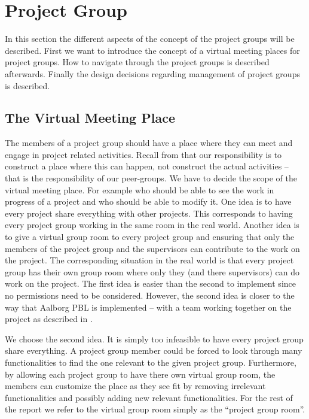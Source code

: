 \section{Project Group}
\label{sec:projectgroup}
In this section the different aspects of the concept of the project groups will be described.
First we want to introduce the concept of a virtual meeting places for project groups.
How to navigate through the project groups is described afterwards.
Finally the design decisions regarding management of project groups is described.

\subsection{The Virtual Meeting Place}
The members of a project group should have a place where they can meet and engage in project related activities.
Recall from  that our responsibility is to construct a place where this can happen, not construct the actual activities -- that is the responsibility of our peer-groups.
We have to decide the scope of the virtual meeting place.
For example who should be able to see the work in progress of a project and who should be able to modify it.
One idea is to have every project share everything with other projects.
This corresponds to having every project group working in the same room in the real world.
Another idea is to give a virtual group room to every project group and ensuring that only the members of the project group and the supervisors can contribute to the work on the project.
The corresponding situation in the real world is that every project group has their own group room where only they (and there supervisors) can do work on the project.
The first idea is easier than the second to implement since no permissions need to be considered.
However, the second idea is closer to the way that Aalborg PBL is implemented -- with a team working together on the project as described in .

We choose the second idea.
It is simply too infeasible to have every project group share everything.
A project group member could be forced to look through many functionalities to find the one relevant to the given project group.
Furthermore, by allowing each project group to have there own virtual group room, the members can customize the place as they see fit by removing irrelevant functionalities and possibly adding new relevant functionalities.
For the rest of the report we refer to the virtual group room simply as the ``project group room''.

